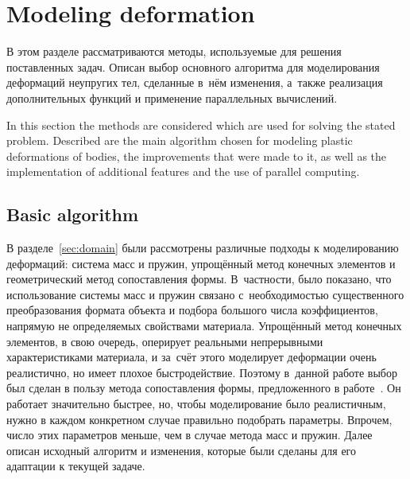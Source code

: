 \documentclass[a4paper, 12pt, titlepage]{extarticle}
\begin{document}
  \section{Modeling deformation}

\begin{original}
    В этом разделе рассматриваются методы, используемые для решения поставленных задач. Описан выбор
    основного алгоритма для моделирования деформаций неупругих тел, сделанные в~нём изменения,
    а~также реализация дополнительных функций и применение параллельных вычислений.
\end{original}

    In this section the methods are considered which are used for solving the stated problem. Described are
    the main algorithm chosen for modeling plastic deformations of bodies, the improvements that were
    made to it, as well as the implementation of additional features and the use of parallel computing.

    \subsection{Basic algorithm}\label{ssec:basic_algorithm}

\begin{original}
      В разделе~\ref{sec:domain} были рассмотрены различные подходы к моделированию деформаций:
      система масс и пружин, упрощённый метод конечных элементов и геометрический метод
      сопоставления формы. В~частности, было показано, что использование системы масс и пружин
      связано с~необходимостью существенного преобразования формата объекта и подбора большого числа
      коэффициентов, напрямую не определяемых свойствами материала. Упрощённый метод конечных
      элементов, в свою очередь, оперирует реальными непрерывными характеристиками материала, и
      за~счёт этого моделирует деформации очень реалистично, но имеет плохое быстродействие. Поэтому
      в~данной работе выбор был сделан в пользу метода сопоставления формы, предложенного в
      работе~\cite{mueller-meshless}. Он работает значительно быстрее, но, чтобы моделирование было
      реалистичным, нужно в каждом конкретном случае правильно подобрать параметры. Впрочем, число
      этих параметров меньше, чем в случае метода масс и пружин. Далее описан исходный алгоритм и
      изменения, которые были сделаны для его адаптации к текущей задаче.
\end{original}
\end{document}
